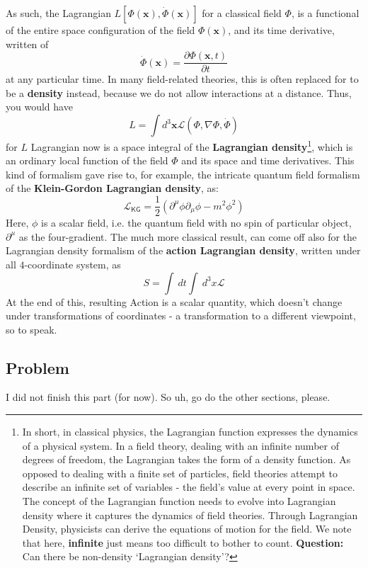 \documentclass[10pt]{article}
\begin{document}
As such, the Lagrangian $L[\Phi(\mathbf{x}),\dot{\Phi}(\mathbf{x})]$ for a classical field $\Phi$, is a functional of the entire space configuration of the field $\Phi(\mathbf{x})$, and its time derivative, written of
\begin{equation}
  \dot{\Phi}(\mathbf{x}) = \frac{\partial \Phi(\mathbf{x},t)}{\partial t}
\end{equation}
at any particular time. In many field-related theories, this is often replaced for to be a \textbf{density} instead, because we do not allow interactions at a distance. Thus, you would have
\begin{equation}
  L = \int d^{3} \mathbf{x} \mathcal{L}(\Phi, \nabla \Phi, \dot{\Phi})
\end{equation}
for $L$ Lagrangian now is a space integral of the \textbf{Lagrangian density}\footnote{In short, in classical physics, the Lagrangian function expresses the dynamics of a physical system. In a field theory, dealing with an infinite number of degrees of freedom, the Lagrangian takes the form of a density function. As opposed to dealing with a finite set of particles, field theories attempt to describe an infinite set of variables - the field's value at every point in space. The concept of the Lagrangian function needs to evolve into Lagrangian density where it captures the dynamics of field theories. Through Lagrangian Density, physicists can derive the equations of motion for the field. We note that here, \textbf{infinite} just means too difficult to bother to count. \textbf{Question:} Can there be non-density `Lagrangian density'?}, which is an ordinary local function of the field $\Phi$ and its space and time derivatives. This kind of formalism gave rise to, for example, the intricate quantum field formalism of the \textbf{Klein-Gordon Lagrangian density}, as:
\begin{equation}
  \mathcal{L}_{\mathsf{KG}} = \frac{1}{2} (\partial^{\mu} \phi \partial_{\mu} \phi - m^{2}\phi^{2})
\end{equation}
Here, $\phi$ is a scalar field, i.e. the quantum field with no spin of particular object, $\partial^{\mu}$ as the four-gradient. The much more classical result, can come off also for the Lagrangian density formalism of the \textbf{action Lagrangian density}, written under all $4$-coordinate system, as 
\begin{equation}
  S = \int \: dt \int \: d^{3}x \mathcal{L} 
\end{equation}
At the end of this, resulting Action is a scalar quantity, which doesn't change under transformations of coordinates - a transformation to a different viewpoint, so to speak.
\subsection{Problem}

I did not finish this part (for now). So uh, go do the other sections, please. 


\end{document}
